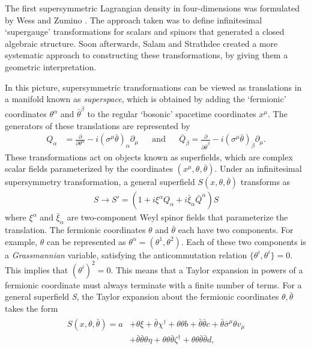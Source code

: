 The first supersymmetric Lagrangian density in four-dimensions was formulated by Wess and Zumino \citep{Wess:1974tw}. The approach taken was to define infinitesimal `supergauge' transformations for scalars and spinors that generated a closed algebraic structure. Soon afterwards, Salam and Strathdee \citep{Salam:1974yz} created a more systematic approach to constructing these transformations, by giving them a geometric interpretation. 

In this picture, supersymmetric transformations can be viewed as translations in a manifold known as \emph{superspace}, which is obtained by adding the `fermionic' coordinates $\theta^\alpha$ and $\bar{\theta}^{\dot{\beta}}$ to the regular `bosonic' spacetime coordinates $x^\mu$. 
The generators of these translations are represented by
\begin{align}
  Q_\alpha &= \frac{\partial}{\partial\theta^\alpha}-i(\sigma^\mu \bar{\theta})_\alpha \partial_\mu&&\text{and}&&
  \bar{Q}_{\dot{\beta}} = \frac{\partial}{\partial\bar{\theta}^{\dot{\beta}}}-i(\sigma^\mu\bar{\theta})_{\dot{\beta}}\partial_\mu.
\label{eq:susy_operators_diff_form}
\end{align}
These transformations act on objects known as superfields, which are complex scalar fields parameterized by the coordinates $(x^\mu,\theta,\bar{\theta})$.
Under an infinitesimal supersymmetry transformation, a general superfield $S(x,\theta,\bar{\theta})$ transforms as
\begin{align}
S\rightarrow S' = (1+i\xi^\alpha Q_\alpha + i\bar{\xi}_{\dot{\alpha}}\bar{Q}^{\dot{\alpha}})S
\label{eq:gen_susy_transformation}
\end{align}
where $\xi^\alpha$ and $\bar{\xi}_{\dot{\alpha}}$ are two-component Weyl spinor fields that parameterize the translation.
The fermionic coordinates $\theta$ and $\bar{\theta}$ each have two components. For example, $\theta$ can be represented as $\theta^\alpha = (\theta^1,\theta^2)$. Each of these two components is a \emph{Grassmannian} variable, satisfying the anticommutation relation $\{\theta^i,\theta^i\} = 0$. This implies that $(\theta^i)^2 = 0$. This means that a Taylor expansion in powers of a fermionic coordinate must always terminate with a finite number of terms. For a general superfield \emph{S}, the Taylor expansion about the fermionic coordinates $\theta,\bar{\theta}$ takes the form
\begin{align}
  \begin{split}
  S(x,\theta,\bar{\theta}) = a &+ \theta\xi + \bar{\theta}\chi^\dagger + \theta\theta b + \bar{\theta}\bar{\theta}c+\bar{\theta}\bar{\sigma}^\mu\theta v_\mu \\
  &+ \bar{\theta}\bar{\theta}\theta\eta + \theta\theta\bar{\theta}\zeta^\dagger+\theta\theta\bar{\theta}\bar{\theta}d,
\end{split}
  \label{eq:general_superfield_expansion}
\end{align}
